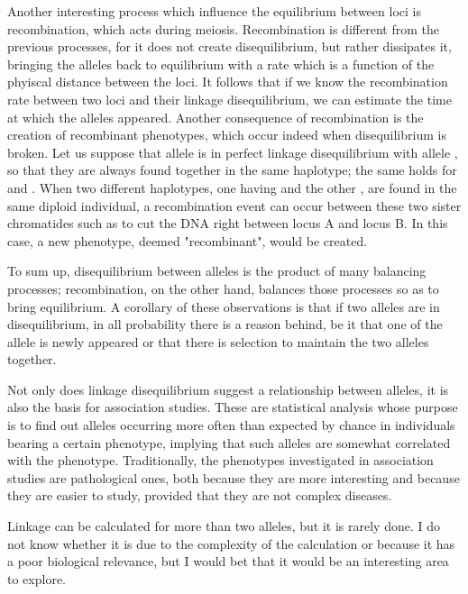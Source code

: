 \documentclass[../main.tex]{subfiles}
\begin{document}
Another interesting process which influence the equilibrium between loci 
is recombination, which acts during meiosis. Recombination is different 
from the previous processes, for it does not create disequilibrium, but 
rather dissipates it, bringing the alleles back to equilibrium with a 
rate which is a function of the phyiscal distance between the loci. It 
follows that if we know the recombination rate between two loci and 
their linkage disequilibrium, we can estimate the time at which the 
alleles appeared. Another consequence of recombination is the creation 
of recombinant phenotypes, which occur indeed when disequilibrium is 
broken. Let us suppose that allele  is in perfect linkage 
disequilibrium with allele , so that they are always found 
together in the same haplotype; the same holds for  and 
. When two different haplotypes, one having  and the 
other , are found in the same diploid individual, a 
recombination event can occur between these two sister chromatides such 
as to cut the DNA right between locus A and locus B. In this case, a new 
phenotype, deemed "recombinant", would be created.


To sum up, disequilibrium between alleles is the product of many 
balancing processes; recombination, on the other hand, balances those 
processes so as to bring equilibrium. A corollary of these observations 
is that if two alleles are in disequilibrium, in all probability there 
is a reason behind, be it that one of the allele is newly appeared or 
that there is selection to maintain the two alleles together.

Not only does linkage disequilibrium suggest a relationship between 
alleles, it is also the basis for association studies. These are 
statistical analysis whose purpose is to find out alleles occurring more 
often than expected by chance in individuals bearing a certain 
phenotype, implying that such alleles are somewhat correlated with the 
phenotype. Traditionally, the phenotypes investigated in association 
studies are pathological ones, both because they are more interesting 
and because they are easier to study, provided that they are not complex 
diseases. 

Linkage can be calculated for more than two alleles, but it is rarely 
done. I do not know whether it is due to the complexity of the 
calculation or because it has a poor biological relevance, but I would 
bet that it would be an interesting area to explore.
\end{document}
